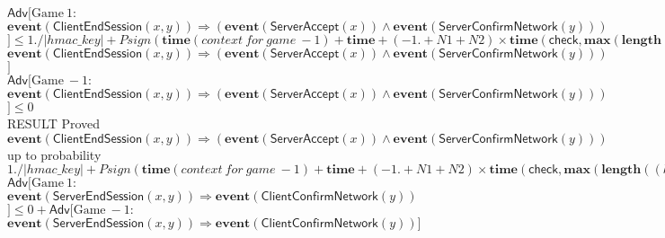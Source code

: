 \documentclass{article}
\newcommand{\kw}[1]{\mathbf{#1}}
\newcommand{\kwf}[1]{\mathsf{#1}}
\newcommand{\var}[1]{\mathit{#1}}
\newcommand{\kwt}[1]{\mathit{#1}}
\newcommand{\kwp}[1]{\mathit{#1}}
\begin{document}
$\mathsf{Adv}[\mathrm{Game}\ 1: $$\kw{event}(\kwf{ClientEndSession}(\var{x}, \var{y})) \Longrightarrow (\kw{event}(\kwf{ServerAccept}(\var{x})) \wedge \kw{event}(\kwf{ServerConfirmNetwork}(\var{y})))$$] \leq 1. / |\kwt{hmac{\_}key}| + \var{Psign}(\kw{time}(\mathit{context\ for\ game}\ -1) + \kw{time} + (-1. + \kwp{N1} + \kwp{N2}) \times \kw{time}(\kwf{check}, \kw{max}(\kw{length}((\kwt{hmac{\_}key}, \kwt{G}, \kwt{bitstring}), \allowbreak \kw{length}(\kwf{hash}, \allowbreak \kw{length}(\kwf{G2bit}))), \allowbreak \kw{length}((\kwt{hmac{\_}key}, \kwt{bitstring}, \kwt{G}, \kwt{bitstring}), \allowbreak \kw{maxlength}(\var{sign{\_}Inv}), \allowbreak \kw{length}(\kwf{hash}, \allowbreak \kw{length}(\kwf{G2bit})))), \allowbreak \kw{max}(\kw{maxlength}(\var{sign{\_}Y}), \allowbreak \kw{maxlength}(\var{sign{\_}B}))), \allowbreak \kwp{N2}, \allowbreak \kw{maxlength}(\var{m}_{4})) + \mathsf{Adv}[\mathrm{Game}\ -1: $$\kw{event}(\kwf{ClientEndSession}(\var{x}, \var{y})) \Longrightarrow (\kw{event}(\kwf{ServerAccept}(\var{x})) \wedge \kw{event}(\kwf{ServerConfirmNetwork}(\var{y})))$$]$\\
$\mathsf{Adv}[\mathrm{Game}\ -1: $$\kw{event}(\kwf{ClientEndSession}(\var{x}, \var{y})) \Longrightarrow (\kw{event}(\kwf{ServerAccept}(\var{x})) \wedge \kw{event}(\kwf{ServerConfirmNetwork}(\var{y})))$$] \leq 0$\\
RESULT Proved $\kw{event}(\kwf{ClientEndSession}(\var{x}, \var{y})) \Longrightarrow (\kw{event}(\kwf{ServerAccept}(\var{x})) \wedge \kw{event}(\kwf{ServerConfirmNetwork}(\var{y})))$ up to probability $1. / |\kwt{hmac{\_}key}| + \var{Psign}(\kw{time}(\mathit{context\ for\ game}\ -1) + \kw{time} + (-1. + \kwp{N1} + \kwp{N2}) \times \kw{time}(\kwf{check}, \kw{max}(\kw{length}((\kwt{hmac{\_}key}, \kwt{G}, \kwt{bitstring}), \allowbreak \kw{length}(\kwf{hash}, \allowbreak \kw{length}(\kwf{G2bit}))), \allowbreak \kw{length}((\kwt{hmac{\_}key}, \kwt{bitstring}, \kwt{G}, \kwt{bitstring}), \allowbreak \kw{maxlength}(\var{sign{\_}Inv}), \allowbreak \kw{length}(\kwf{hash}, \allowbreak \kw{length}(\kwf{G2bit})))), \allowbreak \kw{max}(\kw{maxlength}(\var{sign{\_}Y}), \allowbreak \kw{maxlength}(\var{sign{\_}B}))), \allowbreak \kwp{N2}, \allowbreak \kw{maxlength}(\var{m}_{4}))$\\
$\mathsf{Adv}[\mathrm{Game}\ 1: $$\kw{event}(\kwf{ServerEndSession}(\var{x}, \var{y})) \Longrightarrow \kw{event}(\kwf{ClientConfirmNetwork}(\var{y}))$$] \leq 0 + \mathsf{Adv}[\mathrm{Game}\ -1: $$\kw{event}(\kwf{ServerEndSession}(\var{x}, \var{y})) \Longrightarrow \kw{event}(\kwf{ClientConfirmNetwork}(\var{y}))$$]$\\
\end{document}
